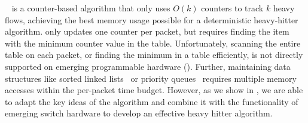 \Spacesaving~\cite{metwally2005efficient} is a counter-based algorithm
that only uses $O(k)$ counters to track $k$ heavy flows, achieving the best
memory usage possible for a deterministic heavy-hitter algorithm. \Spacesaving
only updates one counter per packet, but requires finding the item with the
minimum counter value in the table. Unfortunately, scanning the entire table on
each packet, or finding the minimum in a table efficiently, is not directly
supported on emerging programmable hardware (). Further,
maintaining data structures like sorted linked
lists~\cite{metwally2005efficient} or priority queues~\cite{pifo} requires
multiple memory accesses within the per-packet time budget. %
%
However, as we show in , we are able to adapt the key ideas
of the \spacesaving algorithm and combine it with the functionality of emerging
switch hardware to develop an effective heavy hitter algorithm.
